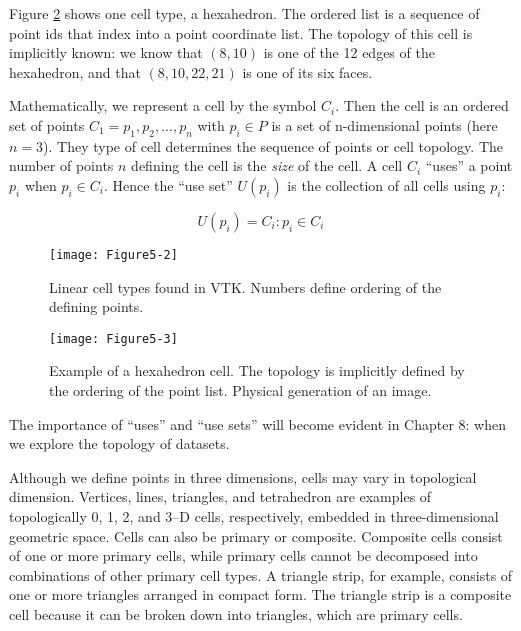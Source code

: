 Figure \ref{fig:Figure5-3} shows one cell type, a hexahedron. The ordered list is a sequence of point ids that index into a point coordinate list. The topology of this cell is implicitly known: we know that $(8,10)$ is one of the 12 edges of the hexahedron, and that $(8,10,22,21)$ is one of its six faces.

Mathematically, we represent a cell by the symbol $C_i$. Then the cell is an ordered set of points $C_1 = {p_1, p_2,..., p_n}$ with $p_i \in P$ is a set of n-dimensional points (here $n=3$). They type of cell determines the sequence of points or cell topology. The number of points $n$ defining the cell is the \emph{size} of the cell. A cell $C_i$ ``uses'' a point $p_i$ when $p_i \in C_i$. Hence the ``use set'' $U(p_i)$ is the collection of all cells using $p_i$:

\begin{equation}\label{eq:5.1}
U(p_i) = {C_i:p_i \in C_i}
\end{equation}

\begin{figure}[!htb]
	\centering
	\texttt{[image: Figure5-2]}
	\caption{Linear cell types found in VTK. Numbers define ordering of the defining points.}
	\label{fig:Figure5-2}
\end{figure}


\begin{figure}[!htb]
	\centering
	\texttt{[image: Figure5-3]}
	\caption{Example of a hexahedron cell. The topology is implicitly defined by the ordering of the point list. Physical generation of an image.}
	\label{fig:Figure5-3}
\end{figure}

The importance of ``uses'' and ``use sets'' will become evident in Chapter 8:  when we explore the topology of datasets.

Although we define points in three dimensions, cells may vary in topological dimension. Vertices, lines, triangles, and tetrahedron are examples of topologically 0, 1, 2, and 3--D cells, respectively, embedded in three-dimensional geometric space. Cells can also be primary or composite. Composite cells consist of one or more primary cells, while primary cells cannot be decomposed into combinations of other primary cell types. A triangle strip, for example, consists of one or more triangles arranged in compact form. The triangle strip is a composite cell because it can be broken down into triangles, which are primary cells.

